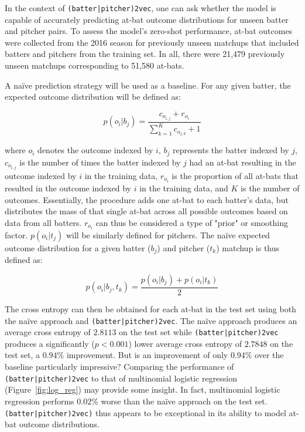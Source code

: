 \documentclass{article}
\begin{document}
In the context of \texttt{(batter|pitcher)2vec}, one can ask whether the model is capable of accurately predicting at-bat outcome distributions for unseen batter and pitcher pairs. To assess the model's zero-shot performance, at-bat outcomes were collected from the 2016 season for previously unseen matchups that included batters and pitchers from the training set. In all, there were 21,479 previously unseen matchups corresponding to 51,580 at-bats.

A naïve prediction strategy will be used as a baseline. For any given batter, the expected outcome distribution will be defined as:

\begin{equation}
\label{eqn:batter_naïve}
p(o_i|b_j)=\frac{c_{o_{i,j}} + r_{o_i}}{\sum_{k=1}^{K} c_{o_{j,k}} + 1}
\end{equation}

where $o_i$ denotes the outcome indexed by $i$, $b_j$ represents the batter indexed by $j$, $c_{o_{i,j}}$ is the number of times the batter indexed by $j$ had an at-bat resulting in the outcome indexed by $i$ in the training data, $r_{o_i}$ is the proportion of all at-bats that resulted in the outcome indexed by $i$ in the training data, and $K$ is the number of outcomes. Essentially, the procedure adds one at-bat to each batter's data, but distributes the mass of that single at-bat across all possible outcomes based on data from all batters. $r_{o_i}$ can thus be considered a type of "prior" or smoothing factor. $p(o_i|t_j)$ will be similarly defined for pitchers. The naïve expected outcome distribution for a given batter ($b_j$) and pitcher ($t_k$) matchup is thus defined as:

\begin{equation}
\label{eqn:naïve}
p(o_i|b_j,t_k) = \frac{p(o_i|b_j) + p(o_i|t_k)}{2}
\end{equation}

The cross entropy can then be obtained for each at-bat in the test set using both the naïve approach and \texttt{(batter|pitcher)2vec}. The naïve approach produces an average cross entropy of $2.8113$ on the test set while \texttt{(batter|pitcher)2vec} produces a significantly ($p < 0.001$) lower average cross entropy of $2.7848$ on the test set, a $0.94\%$ improvement. But is an improvement of only $0.94\%$ over the baseline particularly impressive? Comparing the performance of \texttt{(batter|pitcher)2vec} to that of multinomial logistic regression (Figure~\ref{fig:log_reg}) may provide some insight. In fact, multinomial logistic regression performs $0.02\%$ worse than the naïve approach on the test set. \texttt{(batter|pitcher)2vec)} thus appears to be exceptional in its ability to model at-bat outcome distributions.
\end{document}
